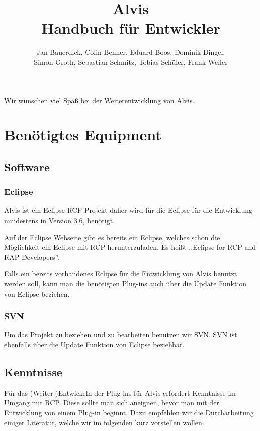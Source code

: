 \documentclass[10pt,a4paper]{article}
\author{Jan Bauerdick,
Colin Benner,
Eduard Boos,
Dominik Dingel,\\
Simon Groth,
Sebastian Schmitz,
Tobias Schüler,
Frank Weiler}
\title{Alvis\\Handbuch für Entwickler}
\begin{document}
\maketitle
\newpage
\tableofcontents
\newpage
Wir wünschen viel Spaß bei der Weiterentwicklung von Alvis.
\section{Benötigtes Equipment}
\subsection{Software}
\subsubsection{Eclipse}
Alvis ist ein Eclipse RCP Projekt daher wird für die Eclipse für die Entwicklung mindestens in Version 3.6, benötigt.

Auf der Eclipse Webseite gibt es bereits ein Eclipse, welches schon die Möglichkeit ein Eclipse mit RCP herunterzuladen. Es heißt ,,Eclipse for RCP and RAP Developers''. 

Falls ein bereits vorhandenes Eclipse für die Entwicklung von Alvis benutzt werden soll, kann man die benötigten Plug-ins auch über die Update Funktion von Eclipse beziehen.
\subsubsection{SVN}
Um das Projekt zu beziehen und zu bearbeiten benutzen wir SVN. SVN ist ebenfalls über die Update Funktion von Eclipse beziehbar.

\subsection{Kenntnisse}
Für das (Weiter-)Entwickeln der Plug-ins für Alvis erfordert Kenntnisse im Umgang mit RCP. Diese sollte man sich aneignen, bevor man mit der Entwicklung von einem Plug-in beginnt. Dazu empfehlen wir die Durcharbeitung einiger Literatur, welche wir im folgenden kurz vorstellen wollen.
\end{document}

